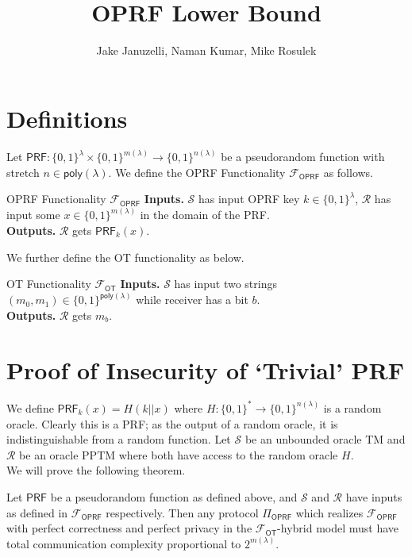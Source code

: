 \documentclass[10pt,a4paper]{article}
\title{\textbf{OPRF Lower Bound}}
\author{Jake Januzelli, Naman Kumar, Mike Rosulek}
\newcommand{\F}{\mathcal{F}}
\newcommand{\poly}{\mathsf{poly}}
\newcommand{\oprf}{\mathsf{OPRF}}
\newcommand{\prf}{\mathsf{PRF}}
\newcommand{\bin}{\{0,1\}}
\newcommand{\secpar}{\lambda}
\newcommand{\sender}{\mathcal{S}}
\newcommand{\receiver}{\mathcal{R}}
\newcommand{\ot}{\mathsf{OT}}
\begin{document}
	\maketitle

\section{Definitions}

Let $\prf:\bin^\secpar\times\bin^{m(\secpar)}\rightarrow\bin^{n(\secpar)}$ be a pseudorandom function with stretch $n\in\poly(\secpar)$. We define the OPRF Functionality $\F_\oprf$ as follows.

\begin{funcbox}{OPRF Functionality $\F_\oprf$}{}{}
	\textbf{Inputs.} $\sender$ has input OPRF key $k\in\bin^\secpar$, $\receiver$ has input some $x\in\bin^{m(\secpar)}$ in the domain of the PRF.\\
	\textbf{Outputs.} $\receiver$ gets $\prf_k(x)$.
\end{funcbox}

We further define the OT functionality as below.

\begin{funcbox}{OT Functionality $\F_\ot$}{}{}
	\textbf{Inputs.} $\sender$ has input two strings $(m_0, m_1)\in\bin^{\poly(\secpar)}$ while receiver has a bit $b$.\\
	\textbf{Outputs.} $\receiver$ gets $m_b$.
\end{funcbox}

\section{Proof of Insecurity of `Trivial' PRF}
We define $\prf_k(x) = H(k || x)$ where $H:\bin^{*}\rightarrow\bin^{n(\secpar)}$ is a random oracle. Clearly this is a PRF; as the output of a random oracle, it is indistinguishable from a random function. Let $\sender$ be an unbounded oracle TM and $\receiver$ be an oracle PPTM where both have access to the random oracle $H$. \\

We will prove the following theorem.

\begin{theorem}
	Let $\prf$ be a pseudorandom function as defined above, and $\sender$ and $\receiver$ have inputs as defined in $\F_\oprf$ respectively. Then any protocol $\Pi_\oprf$ which realizes $\F_\oprf$ with perfect correctness and perfect privacy in the $\F_\ot$-hybrid model must have total communication complexity proportional to $2^{m(\secpar)}$.
\end{theorem}
\end{document}
